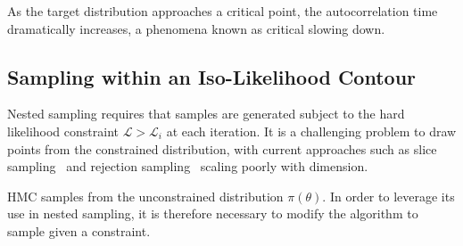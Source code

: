 \documentclass[11pt]{article}
\begin{document}
    As the target distribution approaches a critical point, the autocorrelation time dramatically increases, a phenomena
    known as critical slowing down.

\subsection{Sampling within an Iso-Likelihood Contour}\label{subsec:isolikelood_sampling}
    Nested sampling requires that samples are generated subject to the hard likelihood constraint
    $\mathcal{L} > \mathcal{L}_i$ at each iteration.
    It is a challenging problem to draw points from the constrained distribution, with current approaches such as
    slice sampling~\cite{neal2003slice} and rejection sampling~\cite{Feroz_2009} scaling poorly with dimension.

    HMC samples from the unconstrained distribution $\pi(\theta)$.
    In order to leverage its use in nested sampling, it is therefore necessary to modify the algorithm to sample
    given a constraint.
\end{document}
